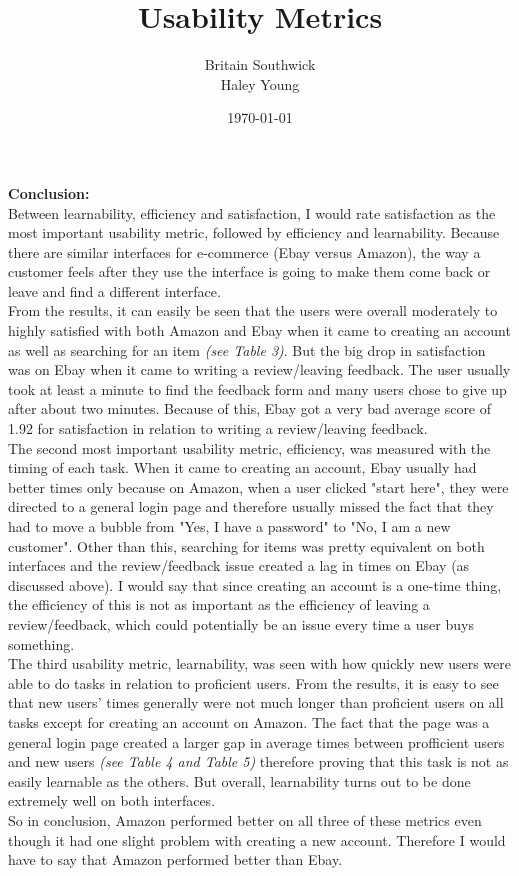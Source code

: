 \documentclass{article}
\title{Usability Metrics}
\author{Britain Southwick\\Haley Young}
\date{\today}
\begin{document}
\maketitle


\textbf{Conclusion:}\\
\indent Between learnability, efficiency and satisfaction, I would rate satisfaction as the most important usability metric, followed by efficiency and learnability. Because there are similar interfaces for e-commerce (Ebay versus Amazon), the way a customer feels after they use the interface is going to make them come back or leave and find a different interface. \\
\indent From the results, it can easily be seen that the users were overall moderately to highly satisfied with both Amazon and Ebay when it came to creating an account as well as searching for an item \emph{(see Table 3)}. But the big drop in satisfaction was on Ebay when it came to writing a review/leaving feedback. The user usually took at least a minute to find the feedback form and many users chose to give up after about two minutes. Because of this, Ebay got a very bad average score of 1.92 for satisfaction in relation to writing a review/leaving feedback.\\
\indent The second most important usability metric, efficiency, was measured with the timing of each task. When it came to creating an account, Ebay usually had better times only because on Amazon, when a user clicked "start here", they were directed to a general login page and therefore usually missed the fact that they had to move a bubble from "Yes, I have a password" to "No, I am a new customer". Other than this, searching for items was pretty equivalent on both interfaces and the review/feedback issue created a lag in times on Ebay (as discussed above). I would say that since creating an account is a one-time thing, the efficiency of this is not as important as the efficiency of leaving a review/feedback, which could potentially be an issue every time a user buys something.\\
\indent The third usability metric, learnability, was seen with how quickly new users were able to do tasks in relation to proficient users. From the results, it is easy to see that new users' times generally were not much longer than proficient users on all tasks except for creating an account on Amazon. The fact that the page was a general login page created a larger gap in average times between profficient users and new users \emph{(see Table 4 and Table 5)} therefore proving that this task is not as easily learnable as the others. But overall, learnability turns out to be done extremely well on both interfaces.\\
\indent So in conclusion, Amazon performed better on all three of these metrics even though it had one slight problem with creating a new account. Therefore I would have to say that Amazon performed better than Ebay.\\
\end{document}
